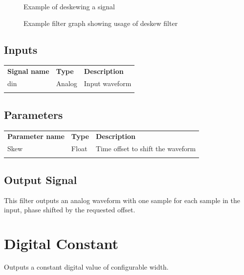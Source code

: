 \begin{figure}[h]
\centering
{}
\caption{Example of deskewing a signal}
\label{filter_deskew}
\end{figure}

\begin{figure}[h]
\centering
{}
\caption{Example filter graph showing usage of deskew filter}
\label{filter_deskew_graph}
\end{figure}

\FloatBarrier

\subsection{Inputs}

\begin{tabularx}{16cm}{llX}
\thickhline
\textbf{Signal name} & \textbf{Type} & \textbf{Description} \\
\thickhline
din & Analog & Input waveform \\
\thickhline
\end{tabularx}

\subsection{Parameters}

\begin{tabularx}{16cm}{llX}
\thickhline
\textbf{Parameter name} & \textbf{Type} & \textbf{Description} \\
\thickhline
Skew & Float & Time offset to shift the waveform\\
\thickhline
\end{tabularx}

\subsection{Output Signal}

This filter outputs an analog waveform with one sample for each sample in the input, phase shifted by the requested
offset.

\pagebreak
\section{Digital Constant}

Outputs a constant digital value of configurable width.

